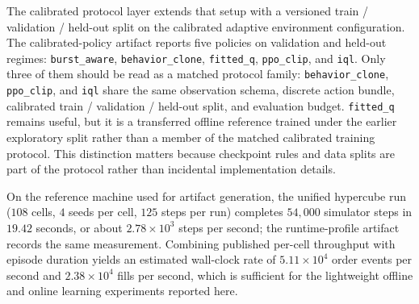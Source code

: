 \documentclass[11pt]{article}
\begin{document}
The calibrated protocol layer extends that setup with a versioned train / validation / held-out split on the calibrated adaptive environment configuration. The calibrated-policy artifact reports five policies on validation and held-out regimes: \texttt{burst\_aware}, \texttt{behavior\_clone}, \texttt{fitted\_q}, \texttt{ppo\_clip}, and \texttt{iql}. Only three of them should be read as a matched protocol family: \texttt{behavior\_clone}, \texttt{ppo\_clip}, and \texttt{iql} share the same observation schema, discrete action bundle, calibrated train / validation / held-out split, and evaluation budget. \texttt{fitted\_q} remains useful, but it is a transferred offline reference trained under the earlier exploratory split rather than a member of the matched calibrated training protocol. This distinction matters because checkpoint rules and data splits are part of the protocol rather than incidental implementation details.

On the reference machine used for artifact generation, the unified hypercube run ($108$ cells, $4$ seeds per cell, $125$ steps per run) completes $54{,}000$ simulator steps in $19.42$ seconds, or about $2.78 \times 10^3$ steps per second; the runtime-profile artifact records the same measurement. Combining published per-cell throughput with episode duration yields an estimated wall-clock rate of $5.11 \times 10^4$ order events per second and $2.38 \times 10^4$ fills per second, which is sufficient for the lightweight offline and online learning experiments reported here.
\end{document}
